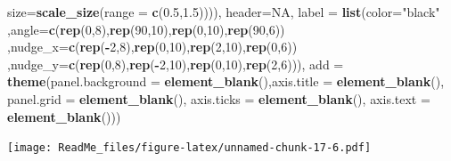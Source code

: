 \documentclass[
]{article}
\newenvironment{Shaded}{\begin{snugshade}}{\end{snugshade}}
\newcommand{\DataTypeTok}[1]{\textcolor[rgb]{0.13,0.29,0.53}{#1}}
\newcommand{\DecValTok}[1]{\textcolor[rgb]{0.00,0.00,0.81}{#1}}
\newcommand{\FloatTok}[1]{\textcolor[rgb]{0.00,0.00,0.81}{#1}}
\newcommand{\KeywordTok}[1]{\textcolor[rgb]{0.13,0.29,0.53}{\textbf{#1}}}
\newcommand{\NormalTok}[1]{#1}
\newcommand{\OperatorTok}[1]{\textcolor[rgb]{0.81,0.36,0.00}{\textbf{#1}}}
\newcommand{\OtherTok}[1]{\textcolor[rgb]{0.56,0.35,0.01}{#1}}
\newcommand{\StringTok}[1]{\textcolor[rgb]{0.31,0.60,0.02}{#1}}
\begin{document}
\begin{Shaded}
\begin{Highlighting}[]
                                \DataTypeTok{size=}\KeywordTok{scale_size}\NormalTok{(}\DataTypeTok{range =} \KeywordTok{c}\NormalTok{(}\FloatTok{0.5}\NormalTok{,}\FloatTok{1.5}\NormalTok{)))),}
       \DataTypeTok{header=}\OtherTok{NA}\NormalTok{,}
       \DataTypeTok{label =} \KeywordTok{list}\NormalTok{(}\DataTypeTok{color=}\StringTok{"black"}
\NormalTok{                    ,}\DataTypeTok{angle=}\KeywordTok{c}\NormalTok{(}\KeywordTok{rep}\NormalTok{(}\DecValTok{0}\NormalTok{,}\DecValTok{8}\NormalTok{),}\KeywordTok{rep}\NormalTok{(}\DecValTok{90}\NormalTok{,}\DecValTok{10}\NormalTok{),}\KeywordTok{rep}\NormalTok{(}\DecValTok{0}\NormalTok{,}\DecValTok{10}\NormalTok{),}\KeywordTok{rep}\NormalTok{(}\DecValTok{90}\NormalTok{,}\DecValTok{6}\NormalTok{))}
\NormalTok{                    ,}\DataTypeTok{nudge_x=}\KeywordTok{c}\NormalTok{(}\KeywordTok{rep}\NormalTok{(}\OperatorTok{-}\DecValTok{2}\NormalTok{,}\DecValTok{8}\NormalTok{),}\KeywordTok{rep}\NormalTok{(}\DecValTok{0}\NormalTok{,}\DecValTok{10}\NormalTok{),}\KeywordTok{rep}\NormalTok{(}\DecValTok{2}\NormalTok{,}\DecValTok{10}\NormalTok{),}\KeywordTok{rep}\NormalTok{(}\DecValTok{0}\NormalTok{,}\DecValTok{6}\NormalTok{))}
\NormalTok{                    ,}\DataTypeTok{nudge_y=}\KeywordTok{c}\NormalTok{(}\KeywordTok{rep}\NormalTok{(}\DecValTok{0}\NormalTok{,}\DecValTok{8}\NormalTok{),}\KeywordTok{rep}\NormalTok{(}\OperatorTok{-}\DecValTok{2}\NormalTok{,}\DecValTok{10}\NormalTok{),}\KeywordTok{rep}\NormalTok{(}\DecValTok{0}\NormalTok{,}\DecValTok{10}\NormalTok{),}\KeywordTok{rep}\NormalTok{(}\DecValTok{2}\NormalTok{,}\DecValTok{6}\NormalTok{))),}
       \DataTypeTok{add   =}  \KeywordTok{theme}\NormalTok{(}\DataTypeTok{panel.background =} \KeywordTok{element_blank}\NormalTok{(),}\DataTypeTok{axis.title =} \KeywordTok{element_blank}\NormalTok{(),}
                      \DataTypeTok{panel.grid =} \KeywordTok{element_blank}\NormalTok{(),}
                      \DataTypeTok{axis.ticks =} \KeywordTok{element_blank}\NormalTok{(),}
                      \DataTypeTok{axis.text =} \KeywordTok{element_blank}\NormalTok{()))}
\end{Highlighting}
\end{Shaded}

\texttt{[image: ReadMe\_files/figure-latex/unnamed-chunk-17-6.pdf]}
\end{document}
